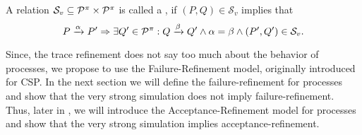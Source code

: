 \begin{definition}
\label{def_strong_sim}
A relation $\mathcal{S}_v\subseteq\mathcal P^{\pi}\times\mathcal P^{\pi}$ is called a , if $(P,Q)\in\mathcal{S}_v$ implies that
\[P \xrightarrow{\alpha} P' \Rightarrow \exists Q'\in\mathcal P^{\pi}: Q \xrightarrow{\beta} Q' \wedge \alpha = \beta \wedge (P',Q')\in\mathcal{S}_v.\]
\end{definition}

Since, the trace refinement does not say too much about the behavior of processes, we propose to use the Failure-Refinement model, originally introduced for CSP. In the next section we will define the failure-refinement for \picalc{} processes and show that the very strong simulation does not imply failure-refinement. Thus, later in , we will introduce the Acceptance-Refinement model for \picalc{} processes and show that the very strong simulation implies acceptance-refinement.